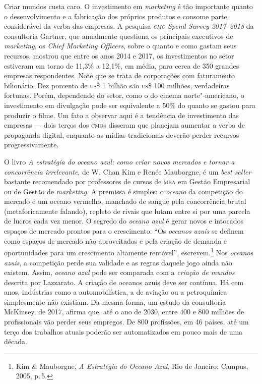 Criar mundos custa caro. O investimento em \textit{marketing} é tão
importante quanto o desenvolvimento e a fabricação dos próprios produtos
e consome parte considerável da verba das empresas. A pesquisa \textit{\textsc{cmo}
Spend Survey 2017--2018} da consultoria Gartner, que anualmente questiona
os principais executivos de \textit{marketing}, os \textit{Chief Marketing
Officers}, sobre o quanto e como gastam seus recursos, mostrou que entre
os anos 2014 e 2017, os investimentos no setor estiveram em torno de
11,3\% a 12,1\%, em média, para cerca de 350 grandes empresas
respondentes. Note que se trata de corporações com faturamento
bilionário. Dez porcento de \textsc{us}\$ 1 bilhão são \textsc{us}\$ 100 milhões,
verdadeiras fortunas. Porém, dependendo do setor, como o do cinema
norte"-americano, o investimento em divulgação pode ser equivalente a
50\% do quanto se gastou para produzir o filme. Um fato a observar aqui
é a tendência de investimento das empresas --- dois terços dos \textsc{cmo}s
disseram que planejam aumentar a verba de propaganda digital, enquanto
as mídias tradicionais deverão perder recursos progressivamente.

O livro \textit{A estratégia do \textit{oceano azul}: como criar novos mercados e
tornar a concorrência irrelevante}, de W. Chan Kim e Renée Mauborgne, é
um \textit{best seller} bastante recomendado por professores de cursos de
\textsc{mba} em Gestão Empresarial ou de Gestão de \textit{marketing}. A premissa é
simples: o \textit{oceano} da competição do mercado é um oceano vermelho,
manchado de sangue pela concorrência brutal (metaforicamente falando),
repleto de rivais que lutam entre si por uma parcela de lucros cada vez
menor. O segredo do \textit{oceano azul} é gerar novos e intocados espaços de
mercado prontos para o crescimento. ``Os \textit{oceanos azuis} se definem como
espaços de mercado não aproveitados e pela criação de demanda e
oportunidades para um crescimento altamente rentável'', escrevem.\footnote{Kim \& Mauborgne, \textit{A Estratégia do Oceano Azul}. Rio de Janeiro: Campus, 2005,
p.\,5.} Nos \textit{oceanos azuis}, a competição perde sua validade e as regras
daquele jogo ainda não existem. Assim, \textit{oceano azul} pode ser
comparada com a \textit{criação de mundos} descrita por Lazzarato. A
criação de oceanos azuis deve ser contínua. Há cem anos, indústrias como
a automobilística, a de aviação ou a petroquímica simplesmente não
existiam. Da mesma forma, um estudo da consultoria McKinsey, de 2017,
afirma que, até o ano de 2030, entre 400 e 800 milhões de profissionais
vão perder seus empregos. De 800 profissões, em 46 países, até um terço
dos trabalhos atuais poderão ser automatizados em pouco mais de uma
década.

